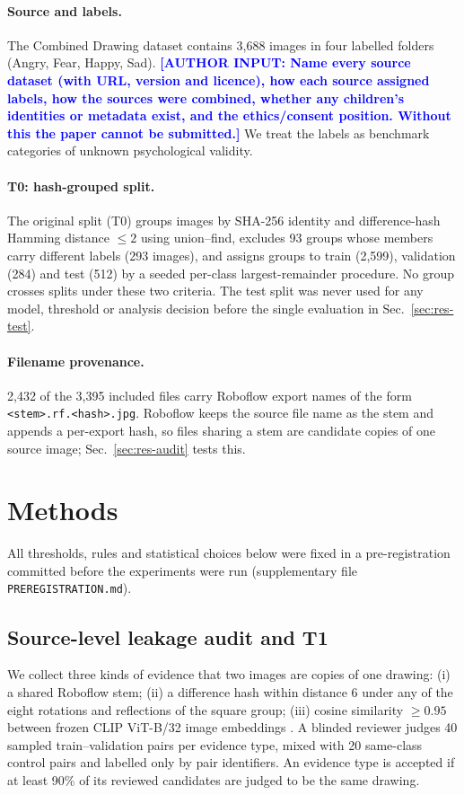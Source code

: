 \documentclass[pdflatex,sn-mathphys-num]{sn-jnl}
\newcommand{\authorinput}[1]{\textcolor{blue}{\textbf{[AUTHOR INPUT: #1]}}}
\begin{document}
\paragraph{Source and labels.} The Combined Drawing dataset contains 3,688 images in four labelled folders (Angry, Fear, Happy, Sad). \authorinput{Name every source dataset (with URL, version and licence), how each source assigned labels, how the sources were combined, whether any children's identities or metadata exist, and the ethics/consent position. Without this the paper cannot be submitted.} We treat the labels as benchmark categories of unknown psychological validity.

\paragraph{T0: hash-grouped split.} The original split (T0) groups images by SHA-256 identity and difference-hash Hamming distance $\le 2$ using union--find, excludes 93 groups whose members carry different labels (293 images), and assigns groups to train (2,599), validation (284) and test (512) by a seeded per-class largest-remainder procedure. No group crosses splits under these two criteria. The test split was never used for any model, threshold or analysis decision before the single evaluation in Sec.~\ref{sec:res-test}.

\paragraph{Filename provenance.} 2,432 of the 3,395 included files carry Roboflow export names of the form \texttt{<stem>.rf.<hash>.jpg}. Roboflow keeps the source file name as the stem and appends a per-export hash, so files sharing a stem are candidate copies of one source image; Sec.~\ref{sec:res-audit} tests this.

\section{Methods}\label{sec:methods}

All thresholds, rules and statistical choices below were fixed in a pre-registration committed before the experiments were run (supplementary file \texttt{PREREGISTRATION.md}).

\subsection{Source-level leakage audit and T1}\label{sec:m-leak}
We collect three kinds of evidence that two images are copies of one drawing: (i) a shared Roboflow stem; (ii) a difference hash within distance 6 under any of the eight rotations and reflections of the square group; (iii) cosine similarity $\ge 0.95$ between frozen CLIP ViT-B/32 image embeddings \cite{radford2021clip}. A blinded reviewer judges 40 sampled train--validation pairs per evidence type, mixed with 20 same-class control pairs and labelled only by pair identifiers. An evidence type is accepted if at least 90\% of its reviewed candidates are judged to be the same drawing.
\end{document}
